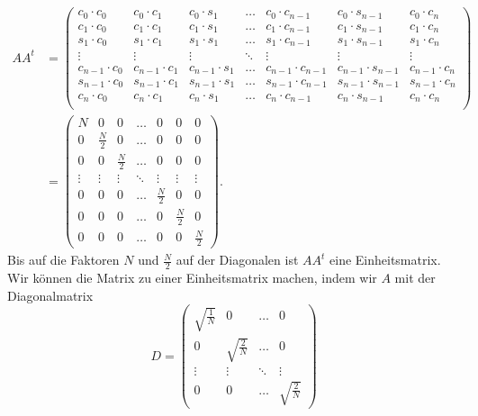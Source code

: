 \begin{align*}
AA^t
&=
\begin{pmatrix}
c_0\cdot c_0&
	c_0\cdot c_1&
		c_0\cdot s_1&
			\dots&
				c_0\cdot c_{n-1}&
					c_0\cdot s_{n-1}&
						c_0\cdot c_n\\
c_1\cdot c_0&
	c_1\cdot c_1&
		c_1\cdot s_1&
			\dots&
				c_1\cdot c_{n-1}&
					c_1\cdot s_{n-1}&
						c_1\cdot c_n\\
s_1\cdot c_0&
	s_1\cdot c_1&
		s_1\cdot s_1&
			\dots&
				s_1\cdot c_{n-1}&
					s_1\cdot s_{n-1}&
						s_1\cdot c_n\\
\vdots	&\vdots	&\vdots	&\ddots	&\vdots	&\vdots	&\vdots	\\
c_{n-1}\cdot c_0&
	c_{n-1}\cdot c_1&
		c_{n-1}\cdot s_1&
			\dots&
				c_{n-1}\cdot c_{n-1}&
					c_{n-1}\cdot s_{n-1}&
						c_{n-1}\cdot c_n\\
s_{n-1}\cdot c_0&
	s_{n-1}\cdot c_1&
		s_{n-1}\cdot s_1&
			\dots&
				s_{n-1}\cdot c_{n-1}&
					s_{n-1}\cdot s_{n-1}&
						s_{n-1}\cdot c_n\\
c_n\cdot c_0&
	c_n\cdot c_1&
		c_n\cdot s_1&
			\dots&
				c_n\cdot c_{n-1}&
					c_n\cdot s_{n-1}&
						c_n\cdot c_n\\
\end{pmatrix}
\\
&=
\begin{pmatrix}
N     &0        &0        &\dots    &0        &0        &0        \\
0     &\frac{N}2&0        &\dots    &0        &0        &0        \\
0     &0        &\frac{N}2&\dots    &0        &0        &0        \\
\vdots&\vdots   &\vdots   &\ddots   &\vdots   &\vdots   &\vdots   \\
0     &0        &0        &\dots    &\frac{N}2&0        &0        \\
0     &0        &0        &\dots    &0        &\frac{N}2&0        \\
0     &0        &0        &\dots    &0        &0        &\frac{N}2
\end{pmatrix}.
\end{align*}
Bis auf die Faktoren $N$ und $\frac{N}2$ auf der Diagonalen ist
$AA^t$ 
eine Einheitsmatrix.
Wir können die Matrix zu einer Einheitsmatrix machen, indem wir 
$A$ mit der Diagonalmatrix
\begin{equation}
D
=
\begin{pmatrix}
\!\sqrt{\frac1N}&0&\dots&0\\
0&\!\sqrt{\frac{2}{N}}&\dots&0\\
\vdots&\vdots&\ddots&\vdots\\
0&0&\dots&\!\sqrt{\frac{2}{N}}
\end{pmatrix}
\end{equation}
